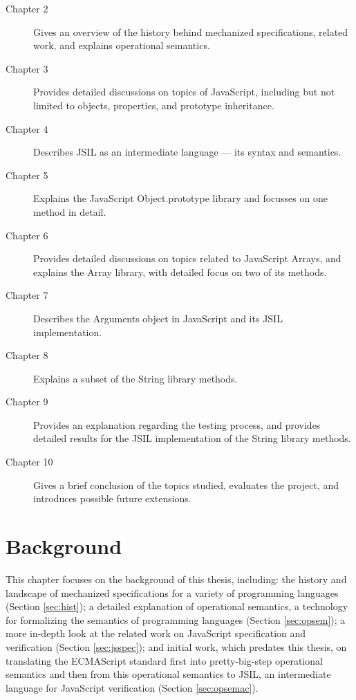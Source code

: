 \documentclass[a4paper,11pt,twoside]{report}
\begin{document}
\begin{description}
\item[Chapter 2] Gives an overview of the history behind mechanized specifications, related work, and explains operational semantics.
\item[Chapter 3] Provides detailed discussions on topics of JavaScript, including but not limited to objects, properties, and prototype inheritance.
\item[Chapter 4] Describes JSIL as an intermediate language --- its syntax and semantics.
\item[Chapter 5] Explains the JavaScript Object.prototype library and focusses on one method in detail.
\item[Chapter 6] Provides detailed discussions on topics related to JavaScript Arrays, and explains the Array library, with detailed focus on two of its methods.
\item[Chapter 7] Describes the Arguments object in JavaScript and its JSIL implementation.
\item[Chapter 8] Explains a subset of the String library methods.
\item[Chapter 9] Provides an explanation regarding the testing process, and provides detailed results for the JSIL implementation of the String library methods.
\item[Chapter 10] Gives a brief conclusion of the topics studied, evaluates the project, and introduces possible future extensions.
\end{description}

\chapter{Background} \label{cha:bckgnd}
This chapter focuses on the background of this thesis, including: the history and landscape of mechanized specifications for a variety of programming languages (Section \ref{sec:hist}); a detailed explanation of operational semantics, a technology for formalizing the semantics of programming languages (Section \ref{sec:opsem}); a more in-depth look at the related work on JavaScript specification and verification (Section \ref{sec:jsspec}); and initial work, which predates this thesis, on translating the ECMAScript standard first into pretty-big-step operational semantics and then from this operational semantics to JSIL, an intermediate language for JavaScript verification (Section \ref{sec:opsemac}).
\end{document}
